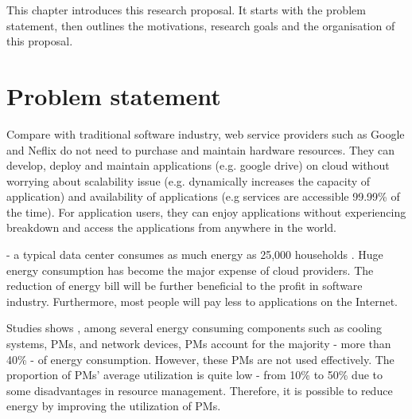 This chapter introduces this research proposal. It starts with the problem statement, then outlines the motivations, research goals and the organisation of this proposal.

\section{Problem statement}

 Compare with traditional software industry, web service providers such as Google and Neflix do not need to purchase and maintain hardware resources. They can develop, deploy and maintain applications (e.g. google drive) on cloud \cite{adhikari:2012uq} without worrying about scalability issue (e.g. dynamically increases the capacity of application) and availability of applications (e.g services are accessible 99.99\% of the time). For application users, they can enjoy applications without experiencing breakdown and access the applications from anywhere in the world.

 - a typical data center consumes as much energy as 25,000 households \cite{dayarathna:2016ua}. Huge energy consumption has become the major expense of cloud providers. The reduction of energy bill will be further beneficial to the profit in software industry. Furthermore, most people will pay less to applications on the Internet. 

 Studies shows \cite{Barroso:2007jt, Shen:2015hm}, among several energy consuming components such as cooling systems, PMs, and network devices, PMs account for the majority - more than 40\% - of energy consumption. However, these PMs are not used effectively. The proportion of PMs' average utilization is quite low - from 10\% to 50\% due to some disadvantages in resource management. Therefore, it is possible to reduce energy by improving the utilization of PMs.

